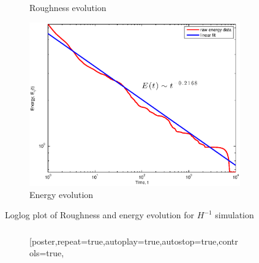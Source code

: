 \documentclass[amstex]{beamer}
\newcommand{\wuhao}{\fontsize{10.5pt}{\baselineskip}\selectfont}    %
\begin{document}
\begin{CJK*}{GBK}{kai}
\begin{frame}
\begin{figure}[ht]
\begin{center}
\begin{subfigure}{0.45\textwidth}
			\caption{Roughness evolution}
		\end{subfigure}
		\begin{subfigure}{0.45\textwidth}
			\includegraphics[width=\textwidth]{figures/hm1energy.eps}
			\caption{Energy evolution}
		\end{subfigure}
	\end{center}
	\caption{Loglog plot of Roughness and energy evolution for $H^{-1}$ simulation }
\end{figure}
\end{frame}
\begin{frame}%
 \frametitle{\wuhao{\bf Main reference}}
    {\footnotesize
    
    
    }
\end{frame}
\begin{frame}
	\frametitle{\wuhao{\bf Preliminary Results for Squared Phase Field Crystal Equation}}
\begin{figure}[ht]
	\begin{center}
		\begin{subfigure}{0.49\textwidth}
                 [poster,repeat=true,autoplay=true,autostop=true,controls=true,

\end{subfigure}
\end{center}
\end{figure}
\end{frame}
\end{CJK*}
\end{document}

